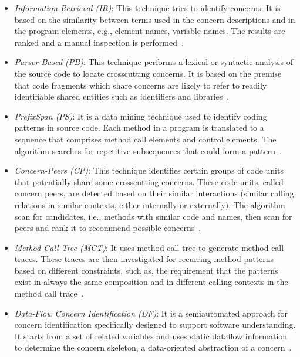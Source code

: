 \begin{itemize}
\item \textit{Information Retrieval (IR)}: This technique tries to identify concerns. It is based on the similarity between terms used in the concern descriptions and in the program elements, e.g., element names, variable names. The results are ranked and a manual inspection is performed~\cite{Eaddy:2008:CTR:1437898.1438590}.

\item \textit{Parser-Based (PB)}: This technique performs a lexical or syntactic analysis of the source code to locate crosscutting concerns. It is based on the premise that code fragments which share concerns are likely to refer to readily identifiable shared entities such as identifiers and libraries~\cite{Griswold}.

\item \textit{PrefixSpan (PS)}: It is a data mining technique used to identify coding patterns in source code. Each method in a program is translated to a sequence that comprises method call elements and control elements. The algorithm searches for repetitive subsequences that could form a pattern~\cite{Ishio:2008:MCP:1447565.1448040}.

\item \textit{Concern-Peers (CP)}: This technique identifies certain groups of code units that potentially share some crosscutting concerns. These code units, called concern peers, are detected based on their similar interactions (similar calling relations in similar contexts, either internally or externally). The algorithm scan for candidates, i.e., methods with similar code and names, then scan for peers and rank it to recommend possible concerns~\cite{Nguyen2011}. 

\item \textit{Method Call Tree (MCT)}: It uses method call tree to generate method call traces. These traces are then investigated for recurring method patterns based on different constraints, such as, the requirement that the patterns exist in always the same composition and in different calling contexts in the method call trace~\cite{Qu:2007:AMU:1262690.1262897}.

\item \textit{Data-Flow Concern Identification (DF)}: It is a semiautomated approach for concern identification specifically designed to support software understanding. It starts from a set of related variables and uses static dataflow information to determine the concern skeleton, a data-oriented abstraction of a concern~\cite{Trifu:2008:UDI:1545010.1545363}.


\end{itemize}
